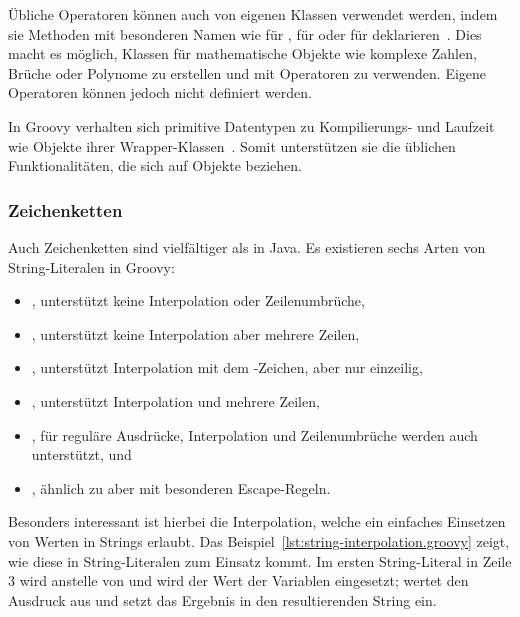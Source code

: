 	Übliche Operatoren können auch von eigenen Klassen verwendet werden, indem sie Methoden mit besonderen Namen wie  für \code{+},  für \code{<<} oder  für \code{++} deklarieren~\cite[{Abs.} 10.]{groovy-lang:operators}.
	Dies macht es möglich, Klassen für mathematische Objekte wie komplexe Zahlen, Brüche oder Polynome zu erstellen und mit Operatoren zu verwenden.
	Eigene Operatoren können jedoch nicht definiert werden.

	In Groovy verhalten sich primitive Datentypen zu Kompilierungs- und Laufzeit wie Objekte ihrer Wrapper-Klassen~\cite[{Abs.} 10.]{groovy-lang:differences}.
	Somit unterstützen sie die üblichen Funktionalitäten, die sich auf Objekte beziehen.

	\subsubsection{Zeichenketten}\label{subsubsec:strings}

	Auch Zeichenketten sind vielfältiger als in Java.
	Es existieren sechs Arten von String-Literalen in Groovy:

	\begin{itemize}
		\item {}, unterstützt keine Interpolation oder Zeilenumbrüche,
		\item {}, unterstützt keine Interpolation aber mehrere Zeilen,
		\item {}, unterstützt Interpolation mit dem \code{$}-Zeichen, aber nur einzeilig,
		\item {}, unterstützt Interpolation und mehrere Zeilen,
		\item {}, für reguläre Ausdrücke, Interpolation und Zeilenumbrüche werden auch unterstützt, und
		\item {}, ähnlich zu  aber mit besonderen Escape-Regeln.
	\end{itemize}

	Besonders interessant ist hierbei die Interpolation, welche ein einfaches Einsetzen von Werten in Strings erlaubt.
	Das Beispiel~\ref{lst:string-interpolation.groovy} zeigt, wie diese in String-Literalen zum Einsatz kommt.
	Im ersten String-Literal in Zeile 3 wird anstelle von  und  wird der Wert der Variablen eingesetzt;
	 wertet den Ausdruck  aus und setzt das Ergebnis in den resultierenden String ein.

